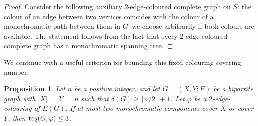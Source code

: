 \documentclass[12pt,reqno,a4paper]{amsart}
\newtheorem{proposition}[theorem] {Proposition}
\def\tc{\mathop{\text{\rm tc}}\nolimits}
\begin{document}
\begin{proof}
Consider the following auxiliary $2$-edge-coloured complete graph on $S$: the colour of an edge between two vertices coincides with the colour of a monochromatic path between them in $G$; we choose arbitrarily if both colours are available. The statement follows from the fact that every $2$-edge-coloured complete graph has a monochromatic spanning tree. 
\end{proof}

We continue with a useful
criterion for bounding this fixed-colouring covering number.

\begin{proposition}\label{prop:5}
%
Let $n$ be a positive integer, and let $G=(X,Y;E)$ be a bipartite graph with
$|X|=|Y|=n$ such that $\delta(G)\ge \lfloor n/2\rfloor+1$. Let $\varphi$ be a
$2$-edge-colouring of $E(G)$. If at most two monochromatic components cover $X$ or
cover $Y$, then $\tc_2(G,\varphi)\le 3$.

\end{proposition}
\end{document}
